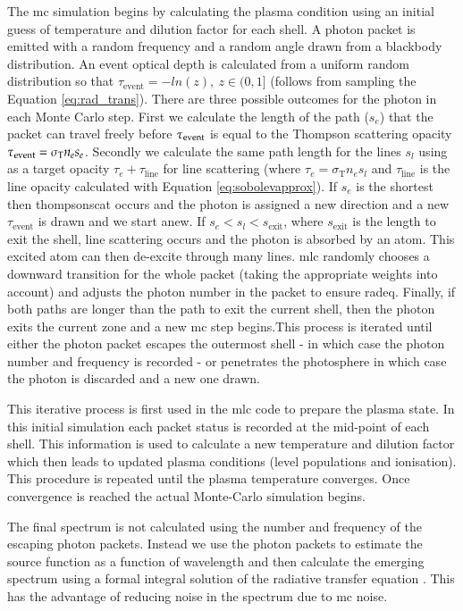 The \gls{mc} simulation begins by calculating the plasma condition using an initial guess of temperature and dilution factor for each shell. A photon packet is emitted with a random frequency and a random angle drawn from a blackbody distribution.  An event optical depth is calculated from a uniform random distribution so that $\tau_\textrm{event}=-ln(z),\ z \in (0,1]$ (follows from sampling the Equation \ref{eq:rad_trans}).  There are three possible outcomes for the photon in each Monte Carlo step. First we calculate the length of the path ($s_e$) that the packet can travel freely before $\tau_{\rm event}$ is equal to the Thompson scattering opacity $\tau_{\rm event} = \sigma_\textrm{T} n_e s_e$. Secondly we calculate the same path length for the lines $s_l$ using as a target opacity $\tau_e + \tau_\textrm{line}$ for line scattering (where $\tau_e=\sigma_\textrm{T} n_e s_l$ and $\tau_\textrm{line}$ is the line opacity calculated with Equation \ref{eq:sobolevapprox}). If $s_e$ is the shortest then \gls{thompsonscat} occurs and the photon is assigned a new direction and a new $\tau_\textrm{event}$ is drawn and we start anew.  If $s_e<s_l<s_\textrm{exit}$, where $s_\textrm{exit}$ is the length to exit the shell, line scattering occurs and the photon is absorbed by an atom. This excited atom can then de-excite through many lines. \gls{mlc} randomly chooses a downward transition for the whole packet (taking the appropriate weights into account) and adjusts the photon number in the packet to ensure \gls{radeq}.  Finally, if both paths are longer than the path to exit the current shell, then the photon exits the current zone and a new \gls{mc} step begins.This process is iterated until either the photon packet escapes the outermost shell - in which case the photon number and frequency is recorded - or penetrates the photosphere in which case the photon is discarded and a new one drawn. 

This iterative process is first used in the \gls{mlc} code to prepare the plasma state. In this initial simulation each packet status is recorded at the mid-point of each shell. This information is used to calculate a new temperature and dilution factor which then leads to updated plasma conditions (level populations and ionisation). This procedure is repeated until the plasma temperature converges. Once convergence is reached the actual Monte-Carlo simulation begins. 

The final spectrum is not calculated using the number and frequency of the escaping photon packets. Instead we use the photon packets to estimate the source function as a function of wavelength and then calculate the emerging spectrum using a formal integral solution of the radiative transfer equation \citep[a more detailed description of this method in][]{2000A&A...363..705M}. This has the advantage of reducing noise in the spectrum due to \gls{mc} noise. 

